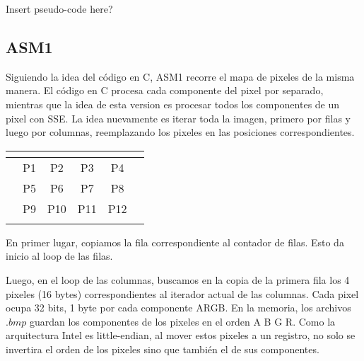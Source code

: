 Insert pseudo-code here?

\pagebreak

\subsection{ASM1}
Siguiendo la idea del código en C, ASM1 recorre el mapa de pixeles de la misma manera. El código en C procesa cada componente del pixel por separado, mientras que la idea de esta version es procesar todos los componentes de un pixel con SSE. La idea nuevamente es iterar toda la imagen, primero por filas y luego por columnas, reemplazando los pixeles en las posiciones correspondientes.

\begin{table}[h]
\mem
\begin{tabular}{l|c|c|c|c|l}
 & \multicolumn{1}{l|}{}      & \multicolumn{1}{l|}{}       & \multicolumn{1}{l|}{}       & \multicolumn{1}{l|}{}       &  \\ \hline
 & \cellcolor[HTML]{FFCB2F}P1 & \cellcolor[HTML]{FFCB2F}P2  & \cellcolor[HTML]{FFCB2F}P3  & \cellcolor[HTML]{FD6864}P4  &  \\ \hline
 & \cellcolor[HTML]{FFCB2F}P5 & \cellcolor[HTML]{FFFC9E}P6  & \cellcolor[HTML]{FFCB2F}P7  & \cellcolor[HTML]{FD6864}P8  &  \\ \hline
 & \cellcolor[HTML]{FFCB2F}P9 & \cellcolor[HTML]{FFCB2F}P10 & \cellcolor[HTML]{FFCB2F}P11 & \cellcolor[HTML]{FD6864}P12 &  \\ \hline
 & \multicolumn{1}{l|}{}      & \multicolumn{1}{l|}{}       & \multicolumn{1}{l|}{}       & \multicolumn{1}{l|}{}       & 
\end{tabular}
\end{table}
En primer lugar, copiamos la fila correspondiente al contador de filas. Esto da inicio al loop de las filas.

Luego, en el loop de las columnas, buscamos en la copia de la primera fila los 4 pixeles (16 bytes) correspondientes al iterador actual de las columnas. Cada pixel ocupa 32 bits, 1 byte por cada componente ARGB. En la memoria, los archivos $.bmp$ guardan los componentes de los pixeles en el orden A B G R. Como la arquitectura Intel es little-endian, al mover estos pixeles a un registro, no solo se invertira el orden de los pixeles sino que también el de sus componentes.

\mem
{}



